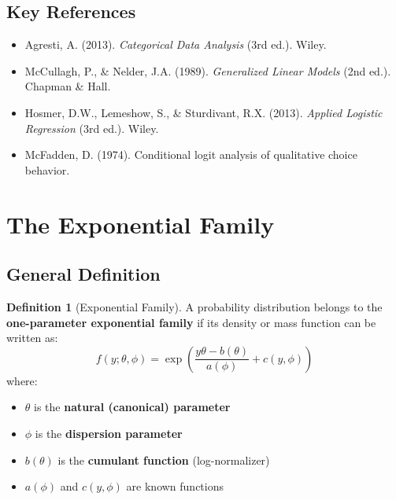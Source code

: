 \documentclass[11pt,letterpaper]{article}
\theoremstyle{definition}
\newtheorem{definition}{Definition}[section]
\begin{document}
\subsection{Key References}

\begin{itemize}
    \item Agresti, A. (2013). \textit{Categorical Data Analysis} (3rd ed.). Wiley.
    \item McCullagh, P., \& Nelder, J.A. (1989). \textit{Generalized Linear Models} (2nd ed.). Chapman \& Hall.
    \item Hosmer, D.W., Lemeshow, S., \& Sturdivant, R.X. (2013). \textit{Applied Logistic Regression} (3rd ed.). Wiley.
    \item McFadden, D. (1974). Conditional logit analysis of qualitative choice behavior.
\end{itemize}

\section{The Exponential Family}

\subsection{General Definition}

\begin{definition}[Exponential Family]
A probability distribution belongs to the \textbf{one-parameter exponential family} if its density or mass function can be written as:
\begin{equation}
    f(y; \theta, \phi) = \exp\left( \frac{y\theta - b(\theta)}{a(\phi)} + c(y, \phi) \right)
    \label{eq:exp-family}
\end{equation}
where:
\begin{itemize}
    \item $\theta$ is the \textbf{natural (canonical) parameter}
    \item $\phi$ is the \textbf{dispersion parameter}
    \item $b(\theta)$ is the \textbf{cumulant function} (log-normalizer)
    \item $a(\phi)$ and $c(y, \phi)$ are known functions
\end{itemize}
\end{definition}
\end{document}
